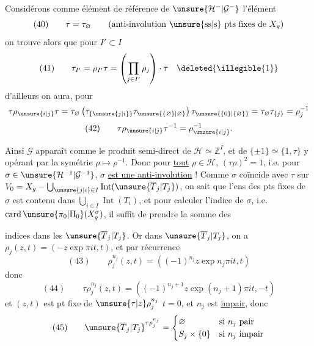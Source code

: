 
Considérons comme élément de référence de $\unsure{\mathcal H^{-}|\mathcal G^{-}}$ l'élément
\[
(40)\qquad \tau=\tau_{\varnothing}\qquad
\text{(anti-involution \unsure{ss|s} pts fixes de $X_g$)}
\]
on trouve alors  que pour $I'\subset I$
\[
(41)\qquad \tau_{I'}=\rho_{I'}\tau=
\left(\prod_{j\in I'}\rho_j\right)\cdot\tau\quad
\deleted{\illegible{1}}
\]
d'ailleurs on aura, pour 
\[
\tau\rho_{\unsure{i|j}}\tau
=\tau_{\varnothing}\left(\tau_{\{\unsure{j|i}\}}\tau_{\unsure{\{\varnothing\}|\varnothing}}\right)
\tau_{\unsure{\{0\}|\{\varnothing\}}}
=\tau_{\varnothing}\tau_{\{j\}}=\rho_j^{-1}
\]
\[
(42)\qquad \tau\rho_{\unsure{i|j}}\tau^{-1}=\rho_{\unsure{i|j}}^{-1}.
\]

Ainsi $\mathcal G$ apparaît comme le produit semi-direct de $\mathcal H\simeq\mathbb Z^I$, et de
$\{\pm1\}\simeq\{1,\tau\}$ y opérant par la symétrie
$\rho\longmapsto\rho^{-1}$. Donc pour \uline{tout} $\rho\in\mathcal H$,
$(\tau\rho)^2=1$, i.e. pour 
$\sigma\in\unsure{\mathcal H^{-1}|\mathcal G^{-1}}$,
$\sigma$  \uline{est une anti-involution} !
Comme $\sigma$ coïncide avec $\tau$ sur
$V_0=X_g-\bigcup_{\unsure{j|i}\in I}\operatorname{Int}(\unsure{\overline T_j|T_j})$,
on sait que l'ens des pts fixes de $\sigma$ est contenu dans
$\bigcup_{i\in I}\operatorname{Int}(T_i)$, et pour calculer l'indice de $\sigma$,
i.e. $\operatorname{card}\unsure{\pi_0|\Pi_0}(X_g^\sigma)$, il suffit de prendre la somme des


indices dans les $\unsure{\overline T_j|T_j}$. Or dans $\unsure{\overline T_j|T_j}$, on a 
$\rho_j(z,t)=(-z\exp\pi it,t)$, et par récurrence
\[
(43)\qquad \rho_j^{n_j}(z,t)=\left((-1)^{n_j}z\exp n_j\pi it,t\right)
\]
donc
\[
(44)\qquad \tau\rho_j^{n_j}(z,t)=
\left((-1)^{n_j+1}z\exp(n_j+1)\pi it,-t\right)
\]
et  $(z,t)$ est pt fixe de
$\unsure{\tau|z}\rho_j^{n_j}$ 
$t=0$,  et $n_j$ est \uline{impair}, donc
\[
(45)\qquad \unsure{\overline T_j|T_j}^{\tau\rho_j^{n_j}}=
\begin{cases}
\varnothing&\text{si $n_j$ pair}\\
S_j\times\{0\}&\text{si $n_j$ impair}
\end{cases}
\]

